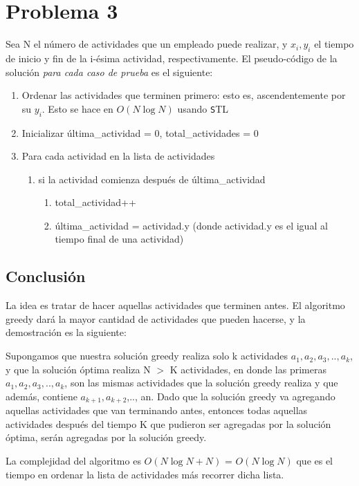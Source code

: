 \documentclass[a4paper,14pt,spanish]{article}
\begin{document}
\clearpage
\section{Problema 3}
Sea N el número de actividades que un empleado puede realizar, y $\displaystyle x_i, y_i$ el tiempo de inicio y
fin de la i-ésima actividad, respectivamente. El pseudo-código de la solución \emph{para cada caso de prueba} es el siguiente:
    \begin{enumerate}
        \item Ordenar las actividades que terminen primero: esto es, ascendentemente por su $\displaystyle y_i$. Esto se hace en $O(N\log{}N)$ usando
              \texttt STL
        \item Inicializar última\_actividad = 0, total\_actividades = 0
        \item Para cada actividad en la lista de actividades
            \begin{enumerate}
                \item si la actividad comienza después de última\_actividad
                    \begin{enumerate}
                        \item total\_actividad++
                        \item última\_actividad = actividad.y (donde actividad.y es el igual al tiempo final de una actividad)
                    \end{enumerate}
            \end{enumerate}
    \end{enumerate}

\subsection{Conclusión}
La idea es tratar de hacer aquellas actividades que terminen antes. El algoritmo greedy dará la mayor cantidad de actividades que pueden hacerse,
y la demostración es la siguiente:

Supongamos que nuestra solución greedy realiza solo k actividades $\displaystyle a_1, a_2, a_3,..,a_k$, y que la solución óptima
realiza N $>$ K actividades, en donde las primeras $\displaystyle a_1, a_2, a_3,..,a_k$, son las mismas actividades que la solución greedy realiza y que además, contiene $\displaystyle a_{k+1}, a_{k+2}$,.., an.
Dado que la solución greedy va agregando aquellas actividades que van terminando antes, entonces todas aquellas actividades después del tiempo K que pudieron ser
agregadas por la solución óptima, serán agregadas por la solución greedy.

La complejidad del algoritmo es $O(N\log{}N + N)$ = $O(N\log{}N)$ que es el tiempo en ordenar la lista de actividades más recorrer dicha lista.

\clearpage
\end{document}
